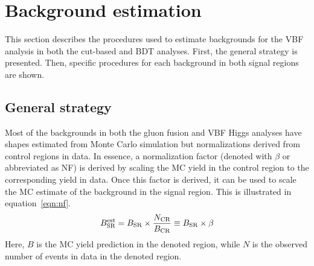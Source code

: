 



\section{Background estimation}
\label{sec:HWWbkg}

This section describes the procedures used to estimate backgrounds for the VBF analysis in both the cut-based and BDT analyses. First, the general strategy is presented. Then, specific procedures for each background in both signal regions are shown. 

\subsection{General strategy}

Most of the backgrounds in both the gluon fusion and VBF Higgs analyses have shapes estimated from Monte Carlo simulation but normalizations derived from control regions in data. In essence, a normalization factor (denoted with $\beta$ or abbreviated as NF) is derived by scaling the MC yield in the control region to the corresponding yield in data. Once this factor is derived, it can be used to scale the MC estimate of the background in the signal region. This is illustrated in equation~\ref{eqn:nf}.
%
\begin{equation}
B_{\rm SR}^{\rm est} = B_{\rm SR} \times \frac{N_{\rm CR}}{B_{\rm CR}} \equiv B_{\rm SR} \times \beta
\label{eqn:nf}
\end{equation}
%
Here, $B$ is the MC yield prediction in the denoted region, while $N$ is the observed number of events in data in the denoted region. 


